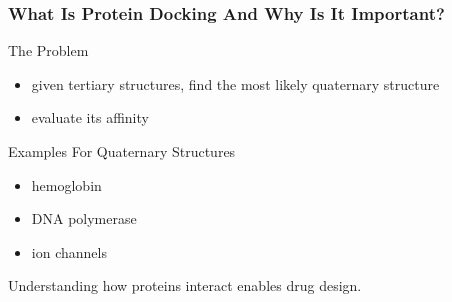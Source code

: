 \documentclass{beamer}
\begin{document}

\begin{frame}
\frametitle{What Is Protein Docking And Why Is It Important?}
\begin{block}{The Problem}
\begin{itemize}
	\item given tertiary structures, find the most likely quaternary structure
	\item evaluate its affinity
\end{itemize}
\end{block}

\begin{block}{Examples For Quaternary Structures}
\begin{itemize}
	\item hemoglobin
	\item DNA polymerase
	\item ion channels
\end{itemize}
Understanding how proteins interact enables drug design.	
\end{block}
\end{frame}

\end{document}
